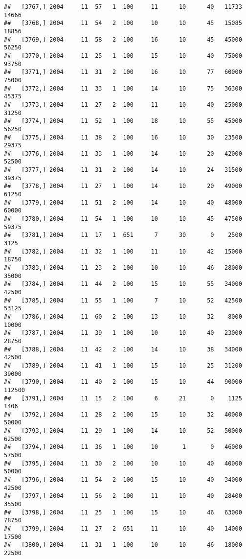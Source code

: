 \documentclass{article}\usepackage[]{graphicx}\usepackage[]{color}
\makeatletter
\newenvironment{kframe}{%
 \def\at@end@of@kframe{}%
 \ifinner\ifhmode%
  \def\at@end@of@kframe{\end{minipage}}%
  \begin{minipage}{\columnwidth}%
 \fi\fi%
 \def\FrameCommand##1{\hskip\@totalleftmargin \hskip-\fboxsep
 \colorbox{shadecolor}{##1}\hskip-\fboxsep
     \hskip-\linewidth \hskip-\@totalleftmargin \hskip\columnwidth}%
 \MakeFramed {\advance\hsize-\width
   \@totalleftmargin\z@ \linewidth\hsize
   \@setminipage}}%
 {\par\unskip\endMakeFramed%
 \at@end@of@kframe}
\newenvironment{knitrout}{}{} %
\makeatother
\begin{document}
\begin{knitrout}
\begin{kframe}
\begin{verbatim}
##   [3767,] 2004     11  57   1  100     11      10      40   11733   14666
##   [3768,] 2004     11  54   2  100     10      10      45   15085   18856
##   [3769,] 2004     11  58   2  100     16      10      45   45000   56250
##   [3770,] 2004     11  25   1  100     15      10      40   75000   93750
##   [3771,] 2004     11  31   2  100     16      10      77   60000   75000
##   [3772,] 2004     11  33   1  100     14      10      75   36300   45375
##   [3773,] 2004     11  27   2  100     11      10      40   25000   31250
##   [3774,] 2004     11  52   1  100     18      10      55   45000   56250
##   [3775,] 2004     11  38   2  100     16      10      30   23500   29375
##   [3776,] 2004     11  33   1  100     14      10      20   42000   52500
##   [3777,] 2004     11  31   2  100     14      10      24   31500   39375
##   [3778,] 2004     11  27   1  100     14      10      20   49000   61250
##   [3779,] 2004     11  51   2  100     14      10      40   48000   60000
##   [3780,] 2004     11  54   1  100     10      10      45   47500   59375
##   [3781,] 2004     11  17   1  651      7      30       0    2500    3125
##   [3782,] 2004     11  32   1  100     11      10      42   15000   18750
##   [3783,] 2004     11  23   2  100     10      10      46   28000   35000
##   [3784,] 2004     11  44   2  100     15      10      55   34000   42500
##   [3785,] 2004     11  55   1  100      7      10      52   42500   53125
##   [3786,] 2004     11  60   2  100     13      10      32    8000   10000
##   [3787,] 2004     11  39   1  100     10      10      40   23000   28750
##   [3788,] 2004     11  42   2  100     14      10      38   34000   42500
##   [3789,] 2004     11  41   1  100     15      10      25   31200   39000
##   [3790,] 2004     11  40   2  100     15      10      44   90000  112500
##   [3791,] 2004     11  15   2  100      6      21       0    1125    1406
##   [3792,] 2004     11  28   2  100     15      10      32   40000   50000
##   [3793,] 2004     11  29   1  100     14      10      52   50000   62500
##   [3794,] 2004     11  36   1  100     10       1       0   46000   57500
##   [3795,] 2004     11  30   2  100     10      10      40   40000   50000
##   [3796,] 2004     11  54   2  100     15      10      40   34000   42500
##   [3797,] 2004     11  56   2  100     11      10      40   28400   35500
##   [3798,] 2004     11  25   1  100     15      10      46   63000   78750
##   [3799,] 2004     11  27   2  651     11      10      40   14000   17500
##   [3800,] 2004     11  31   1  100     10      10      46   18000   22500

\end{verbatim}
\end{kframe}
\end{knitrout}
\end{document}
